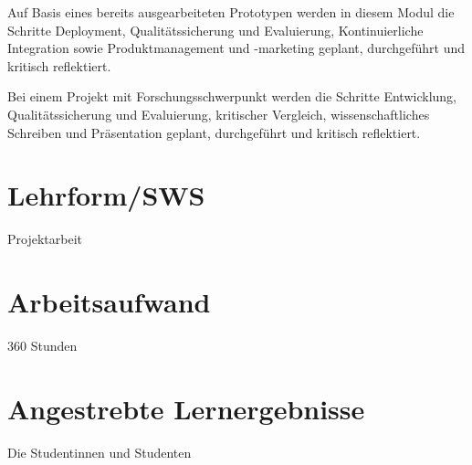 Auf Basis eines bereits ausgearbeiteten Prototypen werden in diesem
Modul die Schritte Deployment, Qualitätssicherung und Evaluierung,
Kontinuierliche Integration sowie Produktmanagement und -marketing
geplant, durchgeführt und kritisch reflektiert.

Bei einem Projekt mit Forschungsschwerpunkt werden die Schritte
Entwicklung, Qualitätssicherung und Evaluierung, kritischer Vergleich,
wissenschaftliches Schreiben und Präsentation geplant, durchgeführt und
kritisch reflektiert.

\section*{Lehrform/SWS\label{/mi-2017/modulbeschreibungen-master/MA_Modul_Projekt_Verwertung}}\label{lehrformswspathlabelmi-2017modulbeschreibungen-mastermaux5fmodulux5fprojektux5fverwertung}

Projektarbeit

\section*{Arbeitsaufwand\label{/mi-2017/modulbeschreibungen-master/MA_Modul_Projekt_Verwertung}}\label{arbeitsaufwandpathlabelmi-2017modulbeschreibungen-mastermaux5fmodulux5fprojektux5fverwertung}

360 Stunden

\section*{Angestrebte
Lernergebnisse\label{/mi-2017/modulbeschreibungen-master/MA_Modul_Projekt_Verwertung}}\label{angestrebte-lernergebnissepathlabelmi-2017modulbeschreibungen-mastermaux5fmodulux5fprojektux5fverwertung}

Die Studentinnen und Studenten

